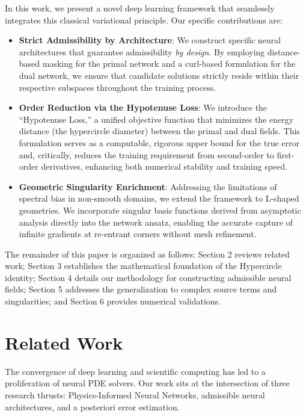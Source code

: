 \documentclass[12pt, a4paper]{article}
\begin{document}
In this work, we present a novel deep learning framework that seamlessly integrates this classical variational principle. Our specific contributions are:
\begin{itemize}
    \item \textbf{Strict Admissibility by Architecture}: We construct specific neural architectures that guarantee admissibility \textit{by design}. By employing distance-based masking for the primal network and a curl-based formulation for the dual network, we ensure that candidate solutions strictly reside within their respective subspaces throughout the training process.
    \item \textbf{Order Reduction via the Hypotenuse Loss}: We introduce the ``Hypotenuse Loss,'' a unified objective function that minimizes the energy distance (the hypercircle diameter) between the primal and dual fields. This formulation serves as a computable, rigorous upper bound for the true error and, critically, reduces the training requirement from second-order to first-order derivatives, enhancing both numerical stability and training speed.
    \item \textbf{Geometric Singularity Enrichment}: Addressing the limitations of spectral bias in non-smooth domains, we extend the framework to L-shaped geometries. We incorporate singular basis functions derived from asymptotic analysis directly into the network ansatz, enabling the accurate capture of infinite gradients at re-entrant corners without mesh refinement.
\end{itemize}

The remainder of this paper is organized as follows: Section 2 reviews related work; Section 3 establishes the mathematical foundation of the Hypercircle identity; Section 4 details our methodology for constructing admissible neural fields; Section 5 addresses the generalization to complex source terms and singularities; and Section 6 provides numerical validations.

\section{Related Work}

The convergence of deep learning and scientific computing has led to a proliferation of neural PDE solvers. Our work sits at the intersection of three research thrusts: Physics-Informed Neural Networks, admissible neural architectures, and a posteriori error estimation.
\end{document}
